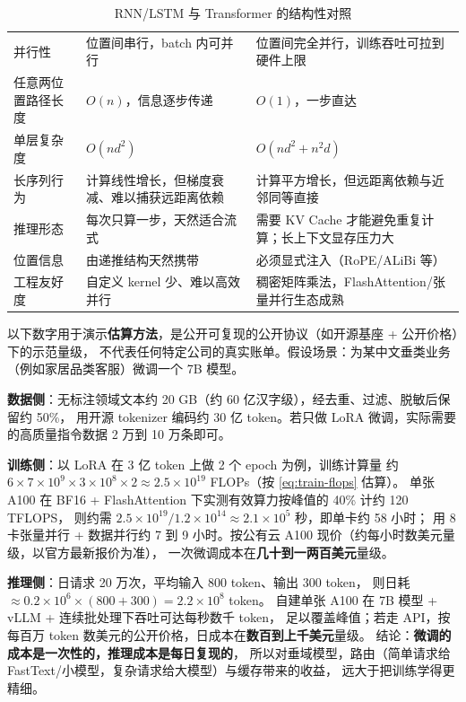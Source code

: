 \begin{table}[htbp]
\centering
\caption{RNN/LSTM 与 Transformer 的结构性对照}
\label{tab:rnn-vs-transformer}
\small
\begin{tabularx}{\textwidth}{L{3.0cm} L{3.6cm} Y}
\toprule
{} &  &  \\
\midrule
并行性 & 位置间串行，batch 内可并行 & 位置间完全并行，训练吞吐可拉到硬件上限 \\
\addlinespace
任意两位置路径长度 & $O(n)$，信息逐步传递 & $O(1)$，一步直达 \\
\addlinespace
单层复杂度 & $O(n d^2)$ & $O(n d^2 + n^2 d)$ \\
\addlinespace
长序列行为 & 计算线性增长，但梯度衰减、难以捕获远距离依赖 & 计算平方增长，但远距离依赖与近邻同等直接 \\
\addlinespace
推理形态 & 每次只算一步，天然适合流式 & 需要 KV Cache 才能避免重复计算；长上下文显存压力大 \\
\addlinespace
位置信息 & 由递推结构天然携带 & 必须显式注入（RoPE/ALiBi 等） \\
\addlinespace
工程友好度 & 自定义 kernel 少、难以高效并行 & 稠密矩阵乘法，FlashAttention/张量并行生态成熟 \\
\bottomrule
\end{tabularx}
\end{table}

\begin{casebox}
以下数字用于演示\textbf{估算方法}，是公开可复现的公开协议（如开源基座 + 公开价格）下的示范量级，
不代表任何特定公司的真实账单。假设场景：为某中文垂类业务（例如家居品类客服）微调一个 7B 模型。

\textbf{数据侧}：无标注领域文本约 20 GB（约 60 亿汉字级），经去重、过滤、脱敏后保留约 50\%，
用开源 tokenizer 编码约 30 亿 token。若只做 LoRA 微调，实际需要的高质量指令数据 2 万到 10 万条即可。

\textbf{训练侧}：以 LoRA 在 3 亿 token 上做 2 个 epoch 为例，训练计算量
约 $6 \times 7 \times 10^9 \times 3 \times 10^8 \times 2 \approx 2.5 \times 10^{19}$ FLOPs（按 \cref{eq:train-flops} 估算）。
单张 A100 在 BF16 + FlashAttention 下实测有效算力按峰值的 40\% 计约 120 TFLOPS，
则约需 $2.5 \times 10^{19} / 1.2 \times 10^{14} \approx 2.1 \times 10^5$ 秒，即单卡约 58 小时；
用 8 卡张量并行 + 数据并行约 7 到 9 小时。按公有云 A100 现价（约每小时数美元量级，以官方最新报价为准），
一次微调成本在\textbf{几十到一两百美元}量级。

\textbf{推理侧}：日请求 20 万次，平均输入 800 token、输出 300 token，
则日耗 $\approx 0.2 \times 10^6 \times (800 + 300) = 2.2 \times 10^8$ token。
自建单张 A100 在 7B 模型 + vLLM + 连续批处理下吞吐可达每秒数千 token，
足以覆盖峰值；若走 API，按每百万 token 数美元的公开价格，日成本在\textbf{数百到上千美元}量级。
结论：\textbf{微调的成本是一次性的，推理成本是每日复现的}，
所以对垂域模型，路由（简单请求给 FastText/小模型，复杂请求给大模型）与缓存带来的收益，
远大于把训练学得更精细。
\end{casebox}


